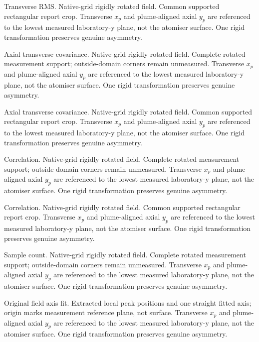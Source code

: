 \caption{Transverse RMS. Native-grid rigidly rotated field. Common supported rectangular report crop. Transverse $x_p$ and plume-aligned axial $y_p$ are referenced to the lowest measured laboratory-y plane, not the atomiser surface. One rigid transformation preserves genuine asymmetry.}

\caption{Axial transverse covariance. Native-grid rigidly rotated field. Complete rotated measurement support; outside-domain corners remain unmeasured. Transverse $x_p$ and plume-aligned axial $y_p$ are referenced to the lowest measured laboratory-y plane, not the atomiser surface. One rigid transformation preserves genuine asymmetry.}

\caption{Axial transverse covariance. Native-grid rigidly rotated field. Common supported rectangular report crop. Transverse $x_p$ and plume-aligned axial $y_p$ are referenced to the lowest measured laboratory-y plane, not the atomiser surface. One rigid transformation preserves genuine asymmetry.}

\caption{Correlation. Native-grid rigidly rotated field. Complete rotated measurement support; outside-domain corners remain unmeasured. Transverse $x_p$ and plume-aligned axial $y_p$ are referenced to the lowest measured laboratory-y plane, not the atomiser surface. One rigid transformation preserves genuine asymmetry.}

\caption{Correlation. Native-grid rigidly rotated field. Common supported rectangular report crop. Transverse $x_p$ and plume-aligned axial $y_p$ are referenced to the lowest measured laboratory-y plane, not the atomiser surface. One rigid transformation preserves genuine asymmetry.}

\caption{Sample count. Native-grid rigidly rotated field. Complete rotated measurement support; outside-domain corners remain unmeasured. Transverse $x_p$ and plume-aligned axial $y_p$ are referenced to the lowest measured laboratory-y plane, not the atomiser surface. One rigid transformation preserves genuine asymmetry.}

\caption{Original field axis fit. Extracted local peak positions and one straight fitted axis; origin marks measurement reference plane, not surface. Transverse $x_p$ and plume-aligned axial $y_p$ are referenced to the lowest measured laboratory-y plane, not the atomiser surface. One rigid transformation preserves genuine asymmetry.}

